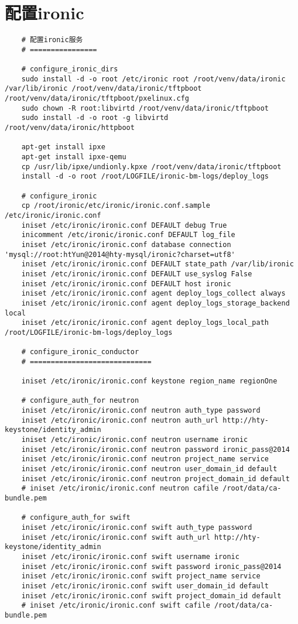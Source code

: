 \documentclass[a4paper,left=1.5cm,right=1.5cm,11pt]{article}
\begin{document}
\section{配置ironic}
	\begin{lstlisting}
	# 配置ironic服务
	# ================

	# configure_ironic_dirs
	sudo install -d -o root /etc/ironic root /root/venv/data/ironic /var/lib/ironic /root/venv/data/ironic/tftpboot /root/venv/data/ironic/tftpboot/pxelinux.cfg
	sudo chown -R root:libvirtd /root/venv/data/ironic/tftpboot
	sudo install -d -o root -g libvirtd /root/venv/data/ironic/httpboot

	apt-get install ipxe
	apt-get install ipxe-qemu
	cp /usr/lib/ipxe/undionly.kpxe /root/venv/data/ironic/tftpboot
	install -d -o root /root/LOGFILE/ironic-bm-logs/deploy_logs

	# configure_ironic
	cp /root/ironic/etc/ironic/ironic.conf.sample /etc/ironic/ironic.conf
	iniset /etc/ironic/ironic.conf DEFAULT debug True
	inicomment /etc/ironic/ironic.conf DEFAULT log_file
	iniset /etc/ironic/ironic.conf database connection 'mysql://root:htYun@2014@hty-mysql/ironic?charset=utf8'
	iniset /etc/ironic/ironic.conf DEFAULT state_path /var/lib/ironic
	iniset /etc/ironic/ironic.conf DEFAULT use_syslog False
	iniset /etc/ironic/ironic.conf DEFAULT host ironic
	iniset /etc/ironic/ironic.conf agent deploy_logs_collect always
	iniset /etc/ironic/ironic.conf agent deploy_logs_storage_backend local
	iniset /etc/ironic/ironic.conf agent deploy_logs_local_path /root/LOGFILE/ironic-bm-logs/deploy_logs

	# configure_ironic_conductor
	# =============================

	iniset /etc/ironic/ironic.conf keystone region_name regionOne

	# configure_auth_for neutron
	iniset /etc/ironic/ironic.conf neutron auth_type password
	iniset /etc/ironic/ironic.conf neutron auth_url http://hty-keystone/identity_admin
	iniset /etc/ironic/ironic.conf neutron username ironic
	iniset /etc/ironic/ironic.conf neutron password ironic_pass@2014
	iniset /etc/ironic/ironic.conf neutron project_name service
	iniset /etc/ironic/ironic.conf neutron user_domain_id default
	iniset /etc/ironic/ironic.conf neutron project_domain_id default
	# iniset /etc/ironic/ironic.conf neutron cafile /root/data/ca-bundle.pem

	# configure_auth_for swift
	iniset /etc/ironic/ironic.conf swift auth_type password
	iniset /etc/ironic/ironic.conf swift auth_url http://hty-keystone/identity_admin
	iniset /etc/ironic/ironic.conf swift username ironic
	iniset /etc/ironic/ironic.conf swift password ironic_pass@2014
	iniset /etc/ironic/ironic.conf swift project_name service
	iniset /etc/ironic/ironic.conf swift user_domain_id default
	iniset /etc/ironic/ironic.conf swift project_domain_id default
	# iniset /etc/ironic/ironic.conf swift cafile /root/data/ca-bundle.pem


\end{lstlisting}
\end{document}

